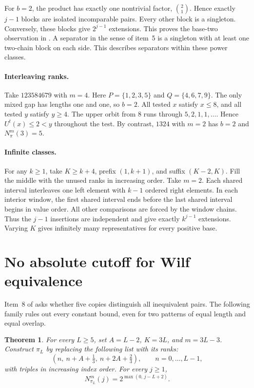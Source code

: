 \documentclass[11pt]{article}
\newtheorem{theorem}{Theorem}
\newcommand{\N}{N_\pi^m}
\begin{document}
For $b=2$, the product has exactly one nontrivial factor, $\binom21$.
Hence exactly $j-1$ blocks are isolated incomparable pairs. Every other block is a singleton.
Conversely, these blocks give $2^{j-1}$ extensions.
This proves the base-two observation in \cite[Section~7, item~9]{bks}.
A separator in the sense of item~5 is a singleton with at least one two-chain block on each side.
This describes separators within these power classes.

\paragraph{Interleaving ranks.}
Take $123584679$ with $m=4$. Here $P=\{1,2,3,5\}$ and $Q=\{4,6,7,9\}$.
The only mixed gap has lengths one and one, so $b=2$.
All tested $x$ satisfy $x\le8$, and all tested $y$ satisfy $y\ge4$.
The upper orbit from $8$ runs through $5,2,1,1,\ldots$.
Hence $U^t(x)\le2<y$ throughout the test.
By contrast, $1324$ with $m=2$ has $b=2$ and $\N(3)=5$.

\paragraph{Infinite classes.}
For any $k\ge1$, take $K\ge k+4$, prefix $(1,k+1)$, and suffix $(K-2,K)$.
Fill the middle with the unused ranks in increasing order. Take $m=2$.
Each shared interval interleaves one left element with $k-1$ ordered right elements.
In each interior window, the first shared interval ends before the last shared interval begins in value order.
All other comparisons are forced by the window chains.
Thus the $j-1$ insertions are independent and give exactly $k^{j-1}$ extensions.
Varying $K$ gives infinitely many representatives for every positive base.

\section{No absolute cutoff for Wilf equivalence}\label{delay}
Item~8 of \cite{bks} asks whether five copies distinguish all inequivalent pairs.
The following family rules out every constant bound, even for two patterns of equal length and equal overlap.

\begin{theorem}\label{delayed}
For every $L\ge5$, set $A=L-2$, $K=3L$, and $m=3L-3$.
Construct $\pi_L$ by replacing the following list with its ranks:
\[
 (n,\ n+A+\tfrac13,\ n+2A+\tfrac23),\qquad n=0,\ldots,L-1,
\]
with triples in increasing index order.
For every $j\ge1$,
\[
 N_{\pi_L}^m(j)=2^{\max(0,\,j-L+2)} .
\]
\end{theorem}
\end{document}
